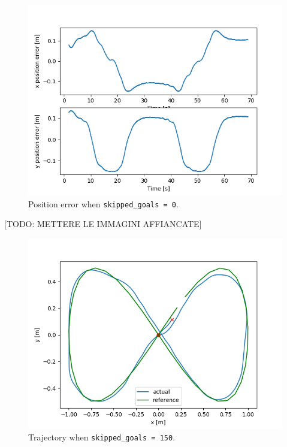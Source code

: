 \documentclass[11pt,a4paper]{article}
\begin{document}
\begin{figure}[H]
    \centering
    \includegraphics[scale=0.4]{different_params/dwa_skippedgoals0/Position_Error.png}
    \caption{Position error when \texttt{skipped\_goals = 0}.}
\end{figure}

[TODO: METTERE LE IMMAGINI AFFIANCATE]

\begin{figure}[H]
    \centering
    \includegraphics[scale=0.4]{different_params/dwa_skippedgoals150/Trajectory.png}
    \caption{Trajectory when \texttt{skipped\_goals = 150}.}
\end{figure}
\end{document}
